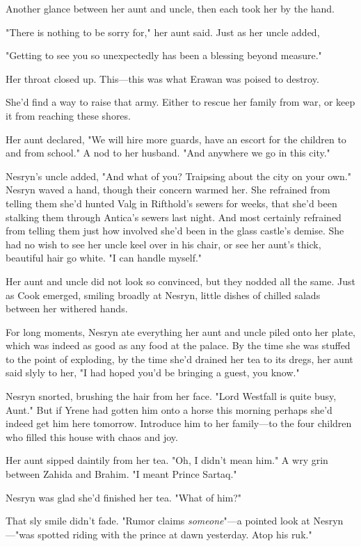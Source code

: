 Another glance between her aunt and uncle, then each took her by the hand.

"There is nothing to be sorry for," her aunt said. Just as her uncle added,

"Getting to see you so unexpectedly has been a blessing beyond measure."

Her throat closed up. This---this was what Erawan was poised to destroy.

She'd find a way to raise that army. Either to rescue her family from war, or keep it from reaching these shores.

Her aunt declared, "We will hire more guards, have an escort for the children to and from school." A nod to her husband. "And anywhere we go in this city."

Nesryn's uncle added, "And what of you? Traipsing about the city on your own." Nesryn waved a hand, though their concern warmed her. She refrained from telling them she'd hunted Valg in Rifthold's sewers for weeks, that she'd been stalking them through Antica's sewers last night. And most certainly refrained from telling them just how involved she'd been in the glass castle's demise. She had no wish to see her uncle keel over in his chair, or see her aunt's thick, beautiful hair go white. "I can handle myself."

Her aunt and uncle did not look so convinced, but they nodded all the same. Just as Cook emerged, smiling broadly at Nesryn, little dishes of chilled salads between her withered hands.

For long moments, Nesryn ate everything her aunt and uncle piled onto her plate, which was indeed as good as any food at the palace. By the time she was stuffed to the point of exploding, by the time she'd drained her tea to its dregs, her aunt said slyly to her, "I had hoped you'd be bringing a guest, you know."

Nesryn snorted, brushing the hair from her face. "Lord Westfall is quite busy, Aunt." But if Yrene had gotten him onto a horse this morning  perhaps she'd indeed get him here tomorrow. Introduce him to her family---to the four children who filled this house with chaos and joy.

Her aunt sipped daintily from her tea. "Oh, I didn't mean him." A wry grin between Zahida and Brahim. "I meant Prince Sartaq."

Nesryn was glad she'd finished her tea. "What of him?"

That sly smile didn't fade. "Rumor claims \emph{someone}"---a pointed look at Nesryn---"was spotted riding with the prince at dawn yesterday. Atop his ruk."

